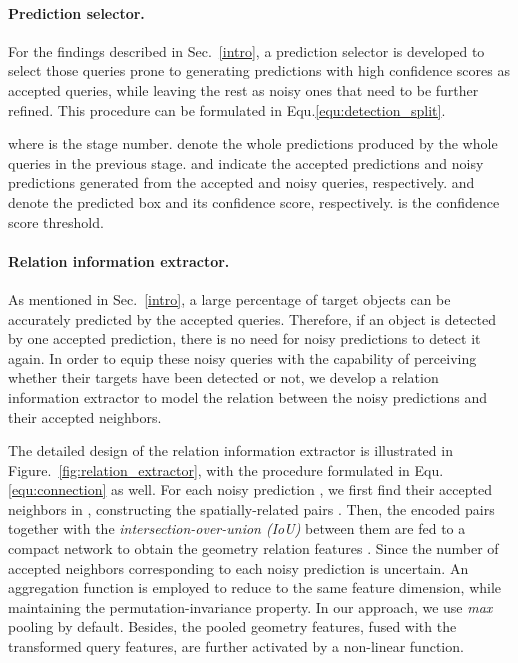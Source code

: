 \documentclass[final]{cvpr}
\begin{document}
\vspace{-0.4cm}
\paragraph{Prediction selector.}

For the findings described in Sec.~\ref{intro},  a prediction selector is developed to select those queries prone to generating predictions with high confidence scores as accepted queries, while leaving the rest as noisy ones that need to be further refined. This procedure can be formulated in Equ.\eqref{equ:detection_split}.

where  is the stage number.  denote the whole predictions produced by the whole queries in the previous  stage.  and  indicate the accepted predictions and noisy predictions generated from the accepted and noisy queries, respectively.  and  denote the predicted box and its confidence score, respectively.  is the confidence score threshold.

\vspace{-0.4cm}
\paragraph{Relation information extractor.} 
As mentioned in Sec.~\ref{intro}, a  large percentage of target objects can be accurately predicted by the accepted queries. Therefore, if an object is detected by one accepted prediction, there is no need for noisy predictions to detect it again. In order to equip these noisy queries with the capability of perceiving whether their targets have been detected or not, we develop a relation information extractor to model the relation between the noisy predictions and their accepted neighbors.

The detailed design of the relation information extractor is illustrated in Figure.~\ref{fig:relation_extractor}, with the procedure formulated in Equ.\eqref{equ:connection} as well. For each noisy prediction , we first find their accepted neighbors  in , constructing the spatially-related pairs . Then, the encoded pairs together with the \textit{intersection-over-union (IoU)} between them are fed to a compact network to obtain the geometry relation features . Since the number of accepted neighbors corresponding to each noisy prediction is uncertain. An aggregation function is employed to reduce  to the same feature dimension, while maintaining the permutation-invariance property. In our approach, we use \textit{max} pooling by default. Besides, the pooled geometry features, fused with the transformed query features, are further activated by a non-linear function.
\end{document}
